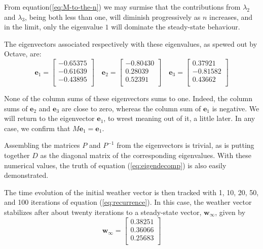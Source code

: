 \documentclass[
  12pt,
  a4paper,
]{article}
\begin{document}
From equation(\ref{eq:M-to-the-n}) we may surmise that the contributions
from \(\lambda_{2}\) and \(\lambda_{3}\), being both less than one, will
diminish progressively as \(n\) increases, and in the limit, only the
eigenvalue \(1\) will dominate the steady-state behaviour.

The eigenvectors associated respectively with these eigenvalues, as
spewed out by Octave, are: \[
\boldsymbol{e}_{1} = \begin{bmatrix}
-0.65375\\
-0.61639\\
-0.43895\\
\end{bmatrix}
\quad
\boldsymbol{e}_{2} = \begin{bmatrix}
-0.80430\\
0.28039\\
0.52391\\
\end{bmatrix}
\quad
\boldsymbol{e}_{3} = \begin{bmatrix}
0.37921\\
-0.81582\\
0.43662\\
\end{bmatrix}
\]

None of the column sums of these eigenvectors sums to one. Indeed, the
column sums of \(\boldsymbol{e}_{2}\) and \(\boldsymbol{e}_{3}\) are
close to zero, whereas the column sum of \(\boldsymbol{e}_{1}\) is
negative. We will return to the eigenvector \(\boldsymbol{e}_{1}\), to
wrest meaning out of it, a little later. In any case, we confirm that
\(M\boldsymbol{e}_{1} = \boldsymbol{e}_{1}\).

Assembling the matrices \(P\) and \(P^{-1}\) from the eigenvectors is
trivial, as is putting together \(D\) as the diagonal matrix of the
corresponding eigenvalues. With these numerical values, the truth of
equation (\ref{eq:eigendecomp}) is also easily demonstrated.

The time evolution of the initial weather vector is then tracked with 1,
10, 20, 50, and 100 iterations of equation (\ref{eq:recurrence}). In
this case, the weather vector stabilizes after about twenty iterations
to a steady-state vector, \(\boldsymbol{w}_{\infty}\), given by
\begin{equation}
\boldsymbol{w}_{\infty} = \begin{bmatrix}
0.38251\\
0.36066\\
0.25683\\
\end{bmatrix}
\label{eq:steady-state}\end{equation}
\end{document}
